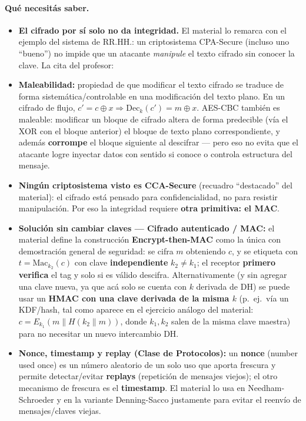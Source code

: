 \paragraph{Qué necesitás saber.}
\begin{itemize}
  \item \textbf{El cifrado por sí solo no da integridad.} El material lo remarca con el
  ejemplo del sistema de RR.HH.: un criptosistema CPA-Secure (incluso uno ``bueno'') no
  impide que un atacante \emph{manipule} el texto cifrado sin conocer la clave. La cita
  del profesor: 
  \item \textbf{Maleabilidad:} propiedad de que modificar el texto cifrado se traduce de
  forma sistemática/controlable en una modificación del texto plano. En un cifrado de
  flujo, $c'=c\oplus x \Rightarrow \mathrm{Dec}_k(c')=m\oplus x$. AES-CBC también es
  maleable: modificar un bloque de cifrado altera de forma predecible (vía el XOR con el
  bloque anterior) el bloque de texto plano correspondiente, y además \textbf{corrompe}
  el bloque siguiente al descifrar --- pero eso no evita que el atacante logre inyectar
  datos con sentido si conoce o controla estructura del mensaje.
  \item \textbf{Ningún criptosistema visto es CCA-Secure} (recuadro ``destacado'' del
  material): el cifrado está pensado para confidencialidad, no para resistir
  manipulación. Por eso la integridad requiere \textbf{otra primitiva: el MAC}.
  \item \textbf{Solución sin cambiar claves --- Cifrado autenticado / MAC:} el material
  define la construcción \textbf{Encrypt-then-MAC} como la única con demostración
  general de seguridad: se cifra $m$ obteniendo $c$, y se etiqueta con
  $t=\mathrm{Mac}_{k_2}(c)$ con clave \textbf{independiente} $k_2\ne k_1$; el receptor
  \textbf{primero verifica} el tag y solo si es válido descifra. Alternativamente (y sin
  agregar una clave nueva, ya que acá solo se cuenta con $k$ derivada de DH) se puede usar
  un \textbf{HMAC con una clave derivada de la misma $k$} (p.\ ej.\ vía un KDF/hash, tal
  como aparece en el ejercicio análogo del material: $c=E_{k_1}(m\|H(k_2\|m))$, donde
  $k_1,k_2$ salen de la misma clave maestra) para no necesitar un nuevo intercambio DH.
  \item \textbf{Nonce, timestamp y replay (Clase de Protocolos):} un \textbf{nonce}
  (number used once) es un número aleatorio de un solo uso que aporta frescura y permite
  detectar/evitar \textbf{replays} (repetición de mensajes viejos); el otro mecanismo de
  frescura es el \textbf{timestamp}. El material lo usa en Needham-Schroeder y en la
  variante Denning-Sacco justamente para evitar el reenvío de mensajes/claves viejas.
\end{itemize}

